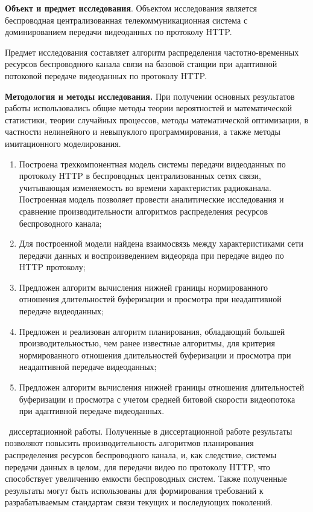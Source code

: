\textbf{Объект и предмет исследования}. Объектом исследования является беспроводная централизованная телекоммуникационная система с доминированием передачи видеоданных по протоколу HTTP.

Предмет исследования составляет алгоритм распределения частотно-временных ресурсов беспроводного канала связи на базовой станции при адаптивной потоковой передаче видеоданных по протоколу HTTP.

\textbf{Методология и методы исследования.} При получении основных результатов работы использовались общие методы теории вероятностей и математической статистики, теории случайных процессов, методы математической оптимизации, в частности нелинейного и невыпуклого программирования, а также методы имитационного моделирования.

\novelty
\begin{enumerate}
    \item Построена трехкомпонентная модель системы передачи видеоданных по протоколу HTTP в беспроводных централизованных сетях связи, учитывающая изменяемость во времени характеристик радиоканала. Построенная модель позволяет провести аналитические исследования и сравнение производительности алгоритмов распределения ресурсов беспроводного канала;
    \item Для построенной модели найдена взаимосвязь между характеристиками сети передачи данных и воспроизведением видеоряда при передаче видео по HTTP протоколу;
    \item Предложен алгоритм вычисления нижней границы нормированного отношения длительностей буферизации и просмотра при неадаптивной передаче видеоданных;
    \item Предложен и реализован алгоритм планирования, обладающий большей производительностью, чем ранее известные алгоритмы, для критерия нормированного отношения длительностей буферизации и просмотра при неадаптивной передаче видеоданных;
    \item Предложен алгоритм вычисления нижней границы отношения длительностей буферизации и просмотра с учетом средней битовой скорости видеопотока при адаптивной передаче видеоданных.
\end{enumerate}

\influence\ диссертационной работы. Полученные в диссертационной работе результаты позволяют повысить производительность алгоритмов планирования распределения ресурсов беспроводного канала, и, как следствие, системы передачи данных в целом, для передачи видео по протоколу HTTP, что способствует увеличению емкости беспроводных систем. Также полученные результаты могут быть использованы для формирования требований к разрабатываемым стандартам связи текущих и последующих поколений.

